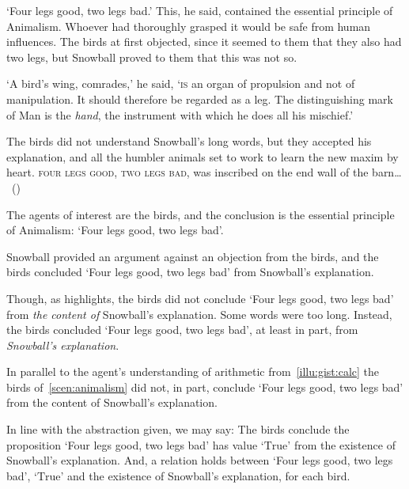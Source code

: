 \begin{note}
  \begin{scenario}[Animalism]
    \label{scen:animalism}
    `Four legs good, two legs bad.'
    This, he said, contained the essential principle of Animalism.
    Whoever had thoroughly grasped it would be safe from human influences.
    The birds at first objected, since it seemed to them that they also had two legs, but Snowball proved to them that this was not so.

    `A bird's wing, comrades,' he said, `\textsc{is} an organ of propulsion and not of manipulation.
    It should therefore be regarded as a leg.
    The distinguishing mark of Man is the \emph{hand}, the instrument with which he does all his mischief.'

    The birds did not understand Snowball's long words, but they accepted his explanation, and all the humbler animals set to work to learn the new maxim by heart.
    \textsc{four legs good, two legs bad}, was inscribed on the end wall of the barn\dots%
    \mbox{ }\hfill\mbox{(\cite[25]{Orwell:1976aa})}%
    \newline
  \end{scenario}

  The agents of interest are the birds, and the conclusion is the essential principle of Animalism:
  `Four legs good, two legs bad'.

  Snowball provided an argument against an objection from the birds, and the birds concluded `Four legs good, two legs bad' from Snowball's explanation.

  Though, as \citeauthor{Orwell:1976aa} highlights, the birds did not conclude `Four legs good, two legs bad' from \emph{the content of} Snowball's explanation.
  Some words were too long.
  Instead, the birds concluded `Four legs good, two legs bad', at least in part, from \emph{Snowball's explanation}.

  In parallel to the agent's understanding of arithmetic from~\autoref{illu:gist:calc} the birds of~\autoref{scen:animalism} did not, in part, conclude `Four legs good, two legs bad' from the content of Snowball's explanation.
\end{note}

\begin{note}
  In line with the abstraction given, we may say:
  The birds conclude the proposition `Four legs good, two legs bad' has value `\(\text{True}\)' from the existence of Snowball's explanation.
  And, a relation holds between `Four legs good, two legs bad', `\(\text{True}\)' and the existence of Snowball's explanation, for each bird.
\end{note}

